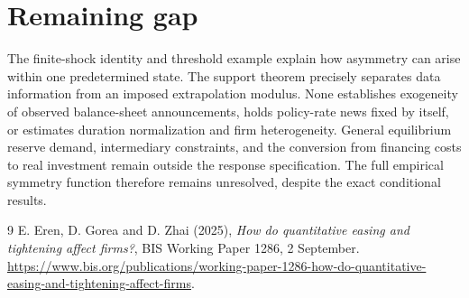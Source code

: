 \documentclass[11pt]{article}
\theoremstyle{definition}
\begin{document}
\section*{Remaining gap}
The finite-shock identity and threshold example explain how asymmetry can arise within one predetermined state. The support theorem precisely separates data information from an imposed extrapolation modulus. None establishes exogeneity of observed balance-sheet announcements, holds policy-rate news fixed by itself, or estimates duration normalization and firm heterogeneity. General equilibrium reserve demand, intermediary constraints, and the conversion from financing costs to real investment remain outside the response specification. The full empirical symmetry function therefore remains unresolved, despite the exact conditional results.

\begin{thebibliography}{9}
 E. Eren, D. Gorea and D. Zhai (2025), \emph{How do quantitative easing and tightening affect firms?}, BIS Working Paper 1286, 2 September. \url{https://www.bis.org/publications/working-paper-1286-how-do-quantitative-easing-and-tightening-affect-firms}.
\end{thebibliography}
\end{document}
